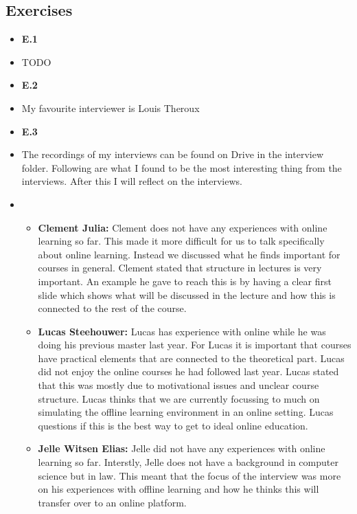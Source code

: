 \documentclass{article}
\begin{document}
\subsection*{Exercises}
\begin{itemize} 
    \item[] \textbf{E.1}
    \item[] TODO
    \item[] \textbf{E.2}
    \item[] My favourite interviewer is Louis Theroux
    \item[] \textbf{E.3}
    \item[] The recordings of my interviews can be found on Drive in the interview folder. 
    Following are what I found to be the most interesting thing from the interviews.
    After this I will reflect on the interviews.
    \item[] 
    \begin{itemize}
        \item[] \textbf{Clement Julia: }  
        Clement does not have any experiences with online learning so far. 
        This made it more difficult for us to talk specifically about online learning. 
        Instead we discussed what he finds important for courses in general. 
        Clement stated that structure in lectures is very important. 
        An example he gave to reach this is by having a clear first slide which shows 
        what will be discussed in the lecture and how this is connected to the rest of the course. 
        \item[] \textbf{Lucas Steehouwer: } 
        Lucas has experience with online while he was doing his previous master last year. 
        For Lucas it is important that courses have practical elements that are connected to the theoretical part. 
        Lucas did not enjoy the online courses he had followed last year. 
        Lucas stated that this was mostly due to motivational issues and unclear course structure. 
        Lucas thinks that we are currently focussing to much on simulating the offline learning 
        environment in an online setting. Lucas questions if this is the best way to get to ideal online education.
        \item[] \textbf{Jelle Witsen Elias: } 
        Jelle did not have any experiences with online learning so far. 
        Interstly, Jelle does not have a background in computer science but in law.
        This meant that the focus of the interview was more on his experiences with
        offline learning and how he thinks this will transfer over to an online platform.

\end{itemize}
\end{itemize}
\end{document}
